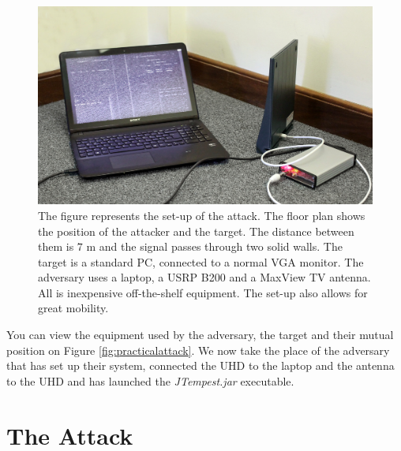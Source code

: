 \documentclass[a4paper,12pt,twoside,openright]{report}
\begin{document}
\begin{figure}[p]
\begin{minipage}[c][9cm][t]{.45\textwidth}
  \label{fig:test2}\par\vfill
  \includegraphics[width=\textwidth]{demo_adversary}
\end{minipage}
\caption{The figure represents the set-up of the attack. The floor plan shows the position of the attacker and the target. The distance between them is $7$ m and the signal passes through two solid walls. The target is a standard PC, connected to a normal VGA monitor. The adversary uses a laptop, a USRP B200 and a MaxView TV antenna. All is inexpensive off-the-shelf equipment. The set-up also allows for great mobility. }
\end{figure}

You can view the equipment used by the adversary, the target and their mutual position on Figure \ref{fig:practicalattack}. We now take the place of the adversary that has set up their system, connected the UHD to the laptop and the antenna to the UHD and has launched the \textit{JTempest.jar} executable.

\section{The Attack}
\end{document}

